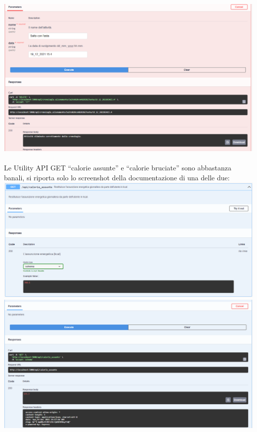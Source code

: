\documentclass{article}
\begin{document}
   \includegraphics[scale=0.5]{risposta delete cronologia_allenamento.png}
   \\
   \\
   Le Utility API GET “calorie assunte” e “calorie bruciate” sono abbastanza banali, si riporta solo lo screenshot della documentazione di una delle due:\\
   \includegraphics[scale=0.5]{doc get calorie_assunte.png}\\
   \includegraphics[scale=0.5]{risposta get calorie_assunte.png}
   \\
   \\
\end{document}
